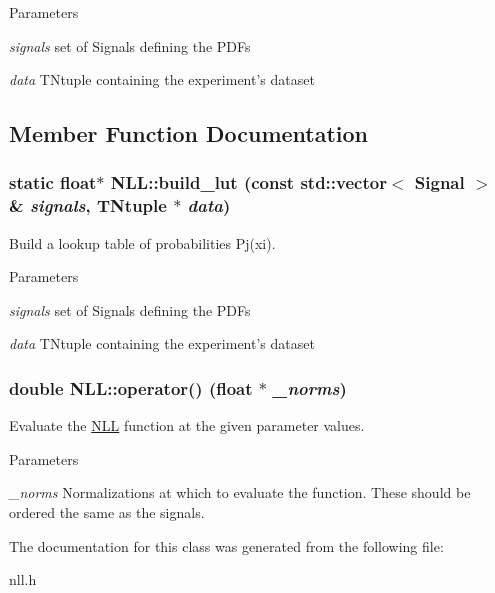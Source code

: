 \begin{DoxyParams}{Parameters}
\item[{\em signals}]set of Signals defining the PDFs \item[{\em data}]TNtuple containing the experiment's dataset \end{DoxyParams}


\subsection{Member Function Documentation}
\hypertarget{classNLL_aba6f617341942f985efba25f5c34f18f}{
\subsubsection[{build\_\-lut}]{\setlength{\rightskip}{0pt plus 5cm}static float$\ast$ NLL::build\_\-lut (const std::vector$<$ {\bf Signal} $>$ \& {\em signals}, \/  TNtuple $\ast$ {\em data})}}
\label{classNLL_aba6f617341942f985efba25f5c34f18f}
Build a lookup table of probabilities Pj(xi).


\begin{DoxyParams}{Parameters}
\item[{\em signals}]set of Signals defining the PDFs \item[{\em data}]TNtuple containing the experiment's dataset \end{DoxyParams}
\hypertarget{classNLL_a2184173a58f1f0378bf9fb48815f903b}{
\subsubsection[{operator()}]{\setlength{\rightskip}{0pt plus 5cm}double NLL::operator() (float $\ast$ {\em \_\-norms})}}
\label{classNLL_a2184173a58f1f0378bf9fb48815f903b}
Evaluate the \hyperlink{classNLL}{NLL} function at the given parameter values.


\begin{DoxyParams}{Parameters}
\item[{\em \_\-norms}]Normalizations at which to evaluate the function. These should be ordered the same as the signals. \end{DoxyParams}


The documentation for this class was generated from the following file:\begin{DoxyCompactItemize}
\item 
nll.h\end{DoxyCompactItemize}
